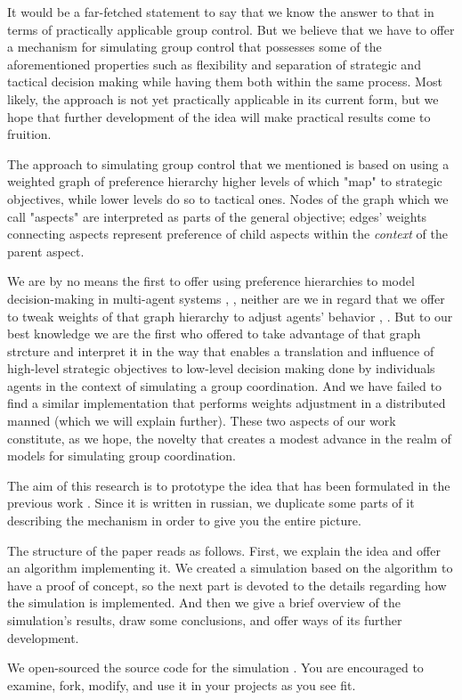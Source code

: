 It would be a far-fetched statement to say that we know the answer to that in terms of practically applicable group
control. But we believe that we have to offer a mechanism for simulating group control that possesses some of the
aforementioned properties such as flexibility and separation of strategic and tactical decision making while having them
both within the same process. Most likely, the approach is not yet practically applicable in its current form, but we
hope that further development of the idea will make practical results come to fruition.

The approach to simulating group control that we mentioned is based on using a weighted graph of preference hierarchy
higher levels of which "map" to strategic objectives, while lower levels do so to tactical ones. Nodes of the graph
which we call "aspects" are interpreted as parts of the general objective; edges' weights connecting aspects represent
preference of child aspects within the \textit{context} of the parent aspect.

We are by no means the first to offer using preference hierarchies to model decision-making in multi-agent systems
\cite{cartvehishvili-2018-model}, \cite{drakaki-2018-intelligent}, neither are we in regard that we offer to tweak
weights of that graph hierarchy to adjust agents' behavior \cite{zytniewski-2016-application},
\cite{brintrup-2010-behaviour}. But to our best knowledge we are the first who offered to take advantage of that graph
strcture and interpret it in the way that enables a translation and influence of high-level strategic objectives to
low-level decision making done by individuals agents in the context of simulating a group coordination. And we have
failed to find a similar implementation that performs weights adjustment in a distributed manned (which we will explain
further). These two aspects of our work constitute, as we hope, the novelty that creates a modest advance in the realm
of models for simulating group coordination.

The aim of this research is to prototype the idea that has been formulated in the previous work
\cite{murashov-2021-ahp}. Since it is written in russian, we duplicate some parts of it describing the mechanism in
order to give you the entire picture.

The structure of the paper reads as follows. First, we explain the idea and offer an algorithm implementing it. We
created a simulation based on the algorithm to have a proof of concept, so the next part is devoted to the details
regarding how the simulation is implemented. And then we give a brief overview of the simulation's results, draw some
conclusions, and offer ways of its further development.

We open-sourced the source code for the simulation \cite{github}. You are encouraged to examine, fork, modify, and use
it in your projects as you see fit.
